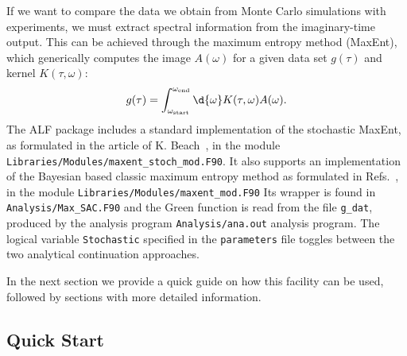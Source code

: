 

If we want to compare the data we obtain from Monte Carlo simulations with experiments, we must extract spectral
 information from the imaginary-time output.
This can be achieved through the maximum entropy method (MaxEnt), which generically computes the  image  $A(\omega) $ 
for a given  data  set $g(\tau) $  and kernel $K(\tau,\omega) $:
\begin{equation}
g(\tau) =  \int_{\omega_\mathrm{start}}^{\omega_\mathrm{end}} \d{\omega} K(\tau,\omega) A(\omega).
\end{equation} 
The  ALF package includes a standard implementation of the stochastic MaxEnt, as formulated in the article of 
K. Beach~\cite{Beach04a}, in the module \texttt{Libraries/Modules/\allowbreak{}maxent\_stoch\_mod.F90}. 
It  also  supports  an  implementation of the  Bayesian  based  classic  maximum entropy  method  as  
formulated  in  Refs.~\cite{Jarrell96,Linden95}, in the 
module \texttt{Libraries/Modules/\allowbreak{}maxent\_mod.F90} 
Its wrapper is found in \texttt{Analysis/Max\_SAC.F90} and the Green function is read from the
file \texttt{g\_dat}, produced  by the  analysis  program   \texttt{Analysis/ana.out} analysis program.
The  logical  variable  \texttt{Stochastic}   specified  in  the  \texttt{parameters} file  toggles between 
the  two  analytical  continuation  approaches.

In the next section we provide a quick guide on how this facility can be used, followed by 
sections with more detailed information.

\subsection{Quick Start}
\label{sec:quick_maxent}

